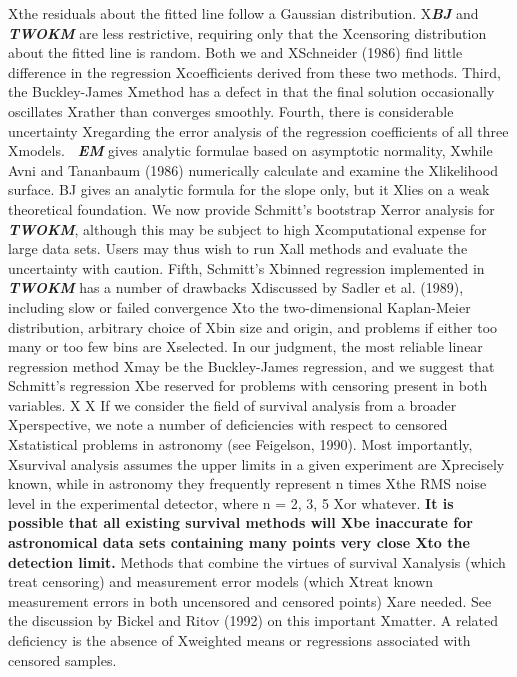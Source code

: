 Xthe  residuals about the fitted line follow a Gaussian distribution.  
X{\sl\bf BJ} and {\sl\bf TWOKM} are less restrictive, requiring only that the 
Xcensoring distribution about the fitted line is random.  Both we and 
XSchneider (1986) find little difference in the regression 
Xcoefficients derived from these two methods.  Third, the Buckley-James
Xmethod has a defect in that the final solution occasionally oscillates
Xrather than converges smoothly.  Fourth, there is considerable uncertainty 
Xregarding the error analysis of the regression coefficients of all three 
Xmodels.  {\sl\bf\ EM} gives analytic formulae based on asymptotic normality, 
Xwhile Avni and Tananbaum (1986) numerically calculate and examine the 
Xlikelihood surface.  BJ gives an analytic formula for the slope only, but it 
Xlies on a weak theoretical foundation.  We now provide Schmitt's bootstrap 
Xerror analysis for {\sl\bf TWOKM}, although this may be subject to high 
Xcomputational expense for large data sets.  Users may thus wish to run 
Xall methods and evaluate the uncertainty with caution.  Fifth, Schmitt's
Xbinned regression implemented in {\sl\bf TWOKM} has a number of drawbacks
Xdiscussed by Sadler et al. (1989), including slow or failed convergence
Xto the two-dimensional Kaplan-Meier distribution, arbitrary choice of
Xbin size and origin, and problems if either too many or too few bins are
Xselected.  In our judgment, the most reliable linear regression method
Xmay be the Buckley-James regression, and we suggest that Schmitt's regression
Xbe reserved for problems with censoring present in both variables. 
X
X    If we consider the field of survival analysis from a broader
Xperspective, we note a number of deficiencies with respect to censored 
Xstatistical problems in astronomy (see Feigelson, 1990).  Most importantly, 
Xsurvival analysis assumes the upper limits in a given experiment are 
Xprecisely known, while in astronomy they frequently represent n times 
Xthe RMS noise level in the experimental detector, where n = 2, 3, 5 
Xor whatever.  {\bf It is possible that all existing survival methods will
Xbe inaccurate for astronomical data sets containing many points very close
Xto the detection limit.}  Methods that combine the virtues of survival
Xanalysis (which treat censoring) and measurement error models (which
Xtreat known measurement errors in both uncensored and censored points)
Xare needed. See the discussion by Bickel and Ritov (1992) on this important
Xmatter.  A related deficiency is the absence of 
Xweighted means or regressions associated with censored samples.
